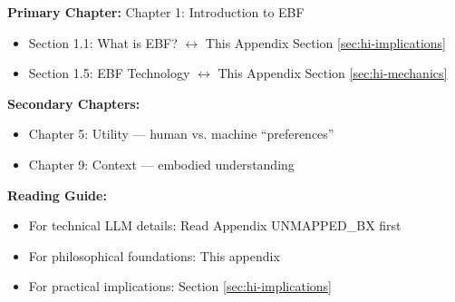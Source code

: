 %
%

%
%
%
%

\begin{tcolorbox}[colback=purple!5!white, colframe=purple!75!black,
    title=Chapter Linkage]

\textbf{Primary Chapter:} Chapter 1: Introduction to EBF
\begin{itemize}[nosep]
\item Section 1.1: What is EBF? $\leftrightarrow$ This Appendix Section \ref{sec:hi-implications}
\item Section 1.5: EBF Technology $\leftrightarrow$ This Appendix Section \ref{sec:hi-mechanics}
\end{itemize}

\textbf{Secondary Chapters:}
\begin{itemize}[nosep]
\item Chapter 5: Utility --- human vs. machine ``preferences''
\item Chapter 9: Context --- embodied understanding
\end{itemize}

\textbf{Reading Guide:}
\begin{itemize}[nosep]
\item For technical LLM details: Read Appendix UNMAPPED_BX first
\item For philosophical foundations: This appendix
\item For practical implications: Section \ref{sec:hi-implications}
\end{itemize}

\end{tcolorbox}

